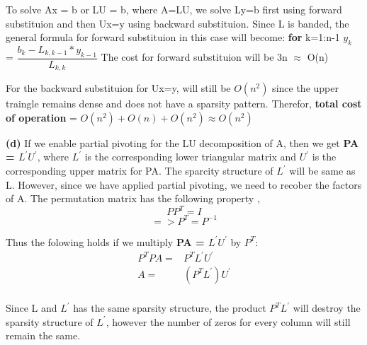 \documentclass{article}
\renewcommand\part[1]{\vspace{.10in}\textbf{(#1)}}
\begin{document}
To solve Ax = b or LU = b, where A=LU, we solve Ly=b first using forward substituion and then Ux=y using backward substituion. Since L is banded, the general formula for forward substituion in this case will become: \newline
\textbf {for} k=1:n-1 \newline
\hspace*{0.5cm} $y_{k}$ = $\dfrac{b_{k} - L_{k,k-1}*y_{k-1}}{L_{k,k}}$ \newline
The cost for forward substituion will be 3n $\approx$ O(n)

For the backward substituion for Ux=y, will still be $O(n^2)$ since the upper traingle remains dense and does not have a sparsity pattern. \newline
Therefor, \textbf {total cost of operation} = $O(n^2) + O(n) + O(n^2) \approx O(n^2)$ \newline


\part{d}
If we enable partial pivoting for the LU decomposition of A, then we get \textbf {PA = $L^\prime U^\prime$}, where $L^\prime$ is the corresponding lower triangular matrix and $U^\prime$ is the corresponding upper matrix for PA. The sparcity structure of $L^\prime$ will be same as L. However, since we have applied partial pivoting, we need to recober the factors of A. The permutation matrix has the following property ,\newline
\[PP^T = I\]
\[=> P^T = P^{-1}\]

Thus the folowing holds if we multiply \textbf {PA = $L^\prime U^\prime$} by $P^T$: \newline
\begin{align*}
P^TPA =& P^TL^\prime U^\prime \\
A =& (P^TL^\prime )U^\prime \\
\end{align*}

Since L and $L^\prime$ has the same sparsity structure, the product $P^TL^\prime$ will destroy the sparsity structure of $L^\prime$, however the number of zeros for every column will still remain the same. \newline
\end{document}
